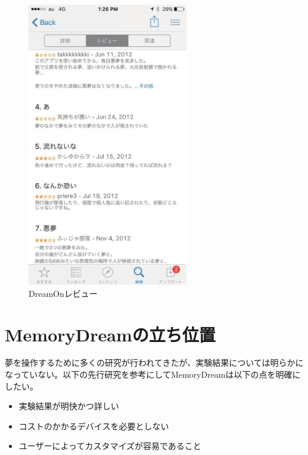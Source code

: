\begin{figure}[htbp]
\begin{center}
\includegraphics[width=7cm]{eps/dreamOn.eps}
\caption{DreamOnレビュー}
\label{DreamOnレビュー}
\end{center}
\end{figure}

\section{MemoryDreamの立ち位置}
夢を操作するために多くの研究が行われてきたが、実験結果については明らかになっていない。以下の先行研究を参考にしてMemoryDreamは以下の点を明確にしたい。
\begin{itemize}
\item 実験結果が明快かつ詳しい
\item コストのかかるデバイスを必要としない
\item ユーザーによってカスタマイズが容易であること
\end{itemize}
